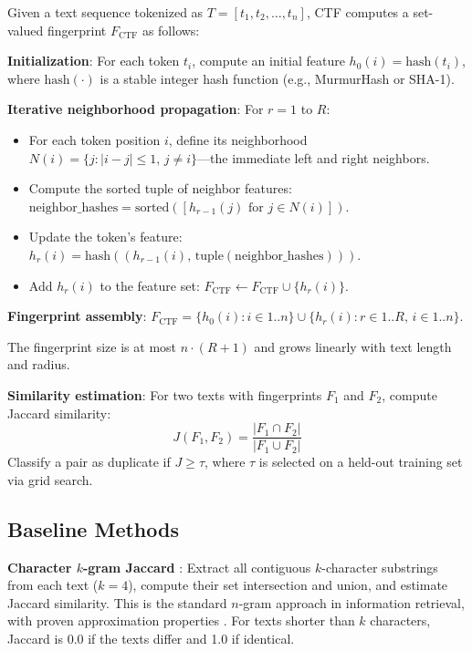 \documentclass[11pt,letterpaper]{article}
\begin{document}
Given a text sequence tokenized as $T = [t_1, t_2, \ldots, t_n]$, CTF computes a set-valued fingerprint $F_{\text{CTF}}$ as follows:

\textbf{Initialization}: For each token $t_i$, compute an initial feature $h_0(i) = \text{hash}(t_i)$, where $\text{hash}(\cdot)$ is a stable integer hash function (e.g., MurmurHash or SHA-1).

\textbf{Iterative neighborhood propagation}: For $r = 1$ to $R$:
\begin{itemize}
  \item For each token position $i$, define its neighborhood $N(i) = \{j : |i - j| \leq 1,\, j \neq i\}$---the immediate left and right neighbors.
  \item Compute the sorted tuple of neighbor features: $\text{neighbor\_hashes} = \text{sorted}([h_{r-1}(j) \text{ for } j \in N(i)])$.
  \item Update the token's feature: $h_r(i) = \text{hash}((h_{r-1}(i),\, \text{tuple}(\text{neighbor\_hashes})))$.
  \item Add $h_r(i)$ to the feature set: $F_{\text{CTF}} \leftarrow F_{\text{CTF}} \cup \{h_r(i)\}$.
\end{itemize}

\textbf{Fingerprint assembly}: $F_{\text{CTF}} = \{h_0(i) : i \in 1..n\} \cup \{h_r(i) : r \in 1..R,\, i \in 1..n\}$.

The fingerprint size is at most $n \cdot (R+1)$ and grows linearly with text length and radius.

\textbf{Similarity estimation}: For two texts with fingerprints $F_1$ and $F_2$, compute Jaccard similarity:
\[
  J(F_1, F_2) = \frac{|F_1 \cap F_2|}{|F_1 \cup F_2|}
\]
Classify a pair as duplicate if $J \geq \tau$, where $\tau$ is selected on a held-out training set via grid search.

\subsection{Baseline Methods}

\textbf{Character $k$-gram Jaccard} \citep{Broder1997, StanfordIR}: Extract all contiguous $k$-character substrings from each text ($k=4$), compute their set intersection and union, and estimate Jaccard similarity. This is the standard $n$-gram approach in information retrieval, with proven approximation properties \citep{Broder1997}. For texts shorter than $k$ characters, Jaccard is 0.0 if the texts differ and 1.0 if identical.
\end{document}
